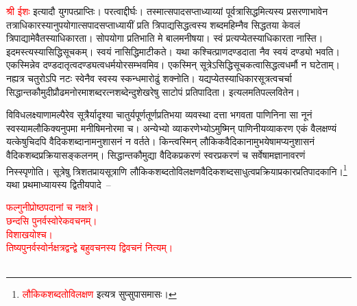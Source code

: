 \begin{sloppypar}
\textcolor{red}{श्री ईशः} इत्यादौ युगपत्प्राप्तिः। परत्वाद्दीर्घः। तस्मात्सपादसप्ताध्याय्यां पूर्वत्रासिद्धमित्यस्य प्रसरणाभावेन तत्राधिकारस्यानुपयोगात्सपाद\-सप्ताध्यायीं प्रति त्रिपाद्यसिद्धत्वस्य शब्द\-महिम्नैव सिद्धतया केवलं त्रिपाद्यामेवैतस्याधिकारता। सोपयोगा प्रतिभाति मे बाल\-मनीषया। स्वं प्रत्यप्येतस्याधिकारता नास्ति। इदमस्त्यस्यासिद्धि\-सूचकम्। स्वयं नासिद्धिमाटीकते। यथा कश्चित्प्राण\-दण्ड\-दाता नैव स्वयं दण्ड्यो भवति। एकस्मिन्नेव दण्ड\-दातृत्व\-दण्ड्यत्व\-धर्मयोरसम्भवमिव। एकस्मिन् सूत्रेऽसिद्धि\-सूचकत्वासिद्धत्व\-धर्मौ न घटेताम्। नह्यत्र चतुरोऽपि नटः स्वेनैव स्वस्य स्कन्धमारोढुं शक्नोति। यद्यप्येतस्याधिकार\-सूत्रत्व\-चर्चा सिद्धान्त\-कौमुदी\-प्रौढ\-मनोरमा\-शब्दरत्न\-शब्देन्दुशेखरेषु साटोपं प्रतिपादिता। इत्यलमतिपल्लवितेन।\end{sloppypar}
\begin{sloppypar}\justifying\noindent\hspace{10mm} विविध\-लक्ष्याणामल्पैरेव सूत्रैर्यादृश्या चातुर्य\-पूर्ण\-तूर्ण\-प्रतिभया व्यवस्था दत्ता भगवता पाणिनिना सा नूनं स्वस्यामलौकिक्यनुपमा मनीषि\-मनोरमा च। अन्येभ्यो व्याकरणेभ्योऽमुष्मिन् पाणिनीय\-व्याकरण एकं वैलक्षण्यं यत्केषुचिदपि वैदिक\-शब्दानामनुशासनं न वर्तते। किन्त्वस्मिन् लौकिक\-वैदिकानामुभयेषामप्यनुशासनं वैदिक\-शब्द\-प्रक्रिया\-सङ्कलनम्। सिद्धान्त\-कौमुद्या वैदिक\-प्रकरणं स्वर\-प्रकरणं च सर्वेषामज्ञानावरणं निस्स्पृणोति। सूत्रेषु त्रिशत\-प्राय\-सूत्राणि लौकिक\-शब्दतो\-विलक्षण\-वैदिक\-शब्द\-साधुत्व\-प्रक्रिया\-प्रकार\-प्रतिपादकानि।\footnote{\textcolor{red}{लौकिक\-शब्दतो\-विलक्षण} इत्यत्र सुप्सुपा\-समासः।} यथा प्रथमाध्यायस्य द्वितीयपादे~–\end{sloppypar}
\centering\textcolor{red}{फल्गुनीप्रोष्ठपदानां च नक्षत्रे।\nopagebreak\\
छन्दसि पुनर्वस्वोरेकवचनम्।\\
विशाखयोश्च।\nopagebreak\\
तिष्यपुनर्वस्वोर्नक्षत्रद्वन्द्वे बहुवचनस्य द्विवचनं नित्यम्।}\nopagebreak\\
\\
